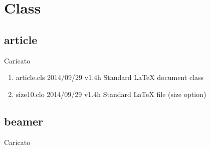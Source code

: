 \chapter{Class}
	\section{article}
	
	Caricato
	\begin{enumerate}
		\item 	article.cls 2014/09/29 v1.4h Standard LaTeX document class
		\item size10.clo 2014/09/29 v1.4h Standard LaTeX file (size option)
	\end{enumerate}
		\section{beamer}
		
		Caricato 
